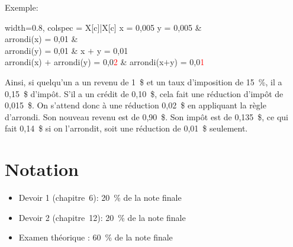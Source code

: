 Exemple:

\noindent
\begin{center}
	\begin{tblr}{
		width=0.8\linewidth,
		colspec = {X[c]|X[c]}
	}
		 x = 0,005 \qquad y = 0,005       &                                        \\ \hline
		arrondi(x) = 0,01                                 &                                        \\
		arrondi(y) = 0,01                                 & x $+$ y = 0,01                         \\
		arrondi(x) $+$ arrondi(y) = 0,0\textcolor{red}{2} & arrondi(x$+$y) = 0,0\textcolor{red}{1}
	\end{tblr}
\end{center}

Ainsi, si quelqu’un a un revenu de 1~\$ et un taux d’imposition de 15~\%, il a 0,15~\$ d’impôt. S’il a un crédit de 0,10~\$, cela fait une réduction d’impôt de 0,015~\$. On s’attend donc à une réduction 0,02~\$ en appliquant la règle d’arrondi. Son nouveau revenu est de 0,90~\$. Son impôt est de 0,135~\$, ce qui fait 0,14~\$ si on l’arrondit, soit une réduction de 0,01~\$ seulement.



\section*{Notation}
\begin{itemize}
	\item Devoir 1 (chapitre~6): 20~\% de la note finale
	\item Devoir 2 (chapitre~12): 20~\% de la note finale
	\item Examen théorique : 60~\% de la note finale
\end{itemize}
